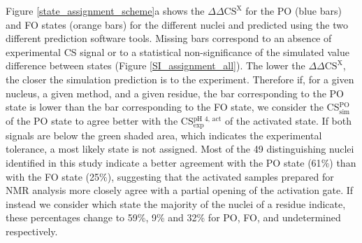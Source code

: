 \documentclass[%
 aip,
 amsmath,amssymb,
 preprint,%
]{revtex4-1}
\begin{document}
Figure \ref{state_assignment_scheme}a shows the $\Delta\Delta\text{CS}^{\text{X}}$ for the PO (blue bars) and FO states (orange bars) for the different nuclei and predicted using the two different prediction software tools. Missing bars correspond to an absence of experimental CS signal or to a statistical non-significance of the simulated value difference between states (Figure \ref{SI_assignment_all}). The lower the $\Delta\Delta\text{CS}^{\text{X}}$, the closer the simulation prediction is to the experiment. Therefore if, for a given nucleus, a given method, and a given residue, the bar corresponding to the PO state is lower than the bar corresponding to the FO state, we consider the CS$^\text{PO}_{\text{sim}}$ of the PO state to agree better with the CS$^\text{pH 4, act}_{\text{exp}}$ of the activated state. If both signals are below the green shaded area, which indicates the experimental tolerance, a most likely state is not assigned. Most of the 49 distinguishing nuclei identified in this study indicate a better agreement with the PO state (61$\%$) than with the FO state (25$\%$), suggesting that the activated samples prepared for NMR analysis more closely agree with a partial opening of the activation gate. If instead we consider which state the majority of the nuclei of a residue indicate, these percentages change to 59\%, 9\% and 32\% for PO, FO, and undetermined respectively.
\end{document}
